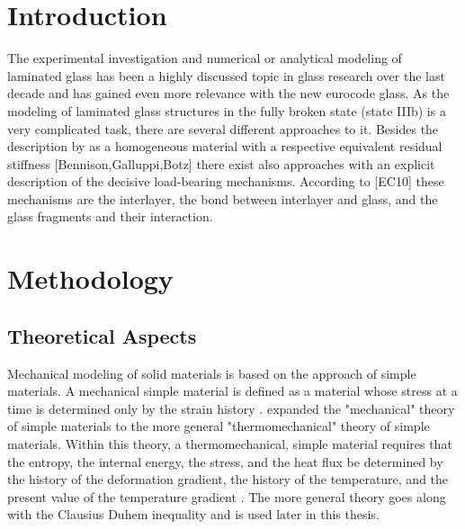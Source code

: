 \documentclass[preprint,12pt,authoryear]{elsarticle}
\begin{document}


\section{Introduction}
\label{sec1}

The experimental investigation and numerical or analytical modeling of laminated glass has been a highly discussed topic in glass research over the last decade and has gained even more relevance with the new eurocode glass. As the modeling of laminated glass structures in the fully broken state (state IIIb) is a very complicated task, there are several different approaches to it. Besides the description by as a homogeneous material with a respective equivalent residual stiffness [Bennison,Galluppi,Botz] there exist also approaches with an explicit description of the decisive load-bearing mechanisms. According to [EC10] these mechanisms are the interlayer, the bond between interlayer and glass, and the glass fragments and their interaction.

\section{Methodology}
\label{sec2}

\subsection{Theoretical Aspects}
\label{subsec2.1}

Mechanical modeling of solid materials is based on the approach of simple materials. A mechanical simple material is defined as a material whose stress at a time is determined only by the strain history \cite{Noll.1957,Noll.1958}. \citet{Coleman.1964} expanded the "mechanical" theory of simple materials to the more general "thermomechanical" theory of simple materials. Within this theory, a thermomechanical, simple material requires that the entropy, the internal energy, the stress, and the heat flux be determined by the history of the deformation gradient, the history of the temperature, and the present value of the temperature gradient \cite{Coleman.1964}. The more general theory goes along with the Clausius Duhem inequality and is used later in this thesis. 
\end{document}
